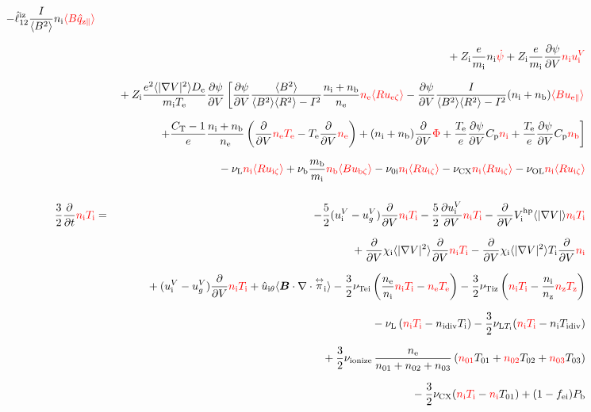 \documentclass[11pt]{article}
\def\bvec#1{\leavevmode\hbox{\boldmath$#1$}}
\let\vec=\bvec
\def\r#1{{\rm#1}}
\def\aves#1{\langle#1\rangle}
\def\dd#1#2{\frac{\partial #1}{\partial #2}}
\def\tensor#1{\mathord{\displaystyle\mathop{#1}^\leftrightarrow}}
\def\para{\parallel}
\def\ddV{\frac{\partial}{\partial V}}
\def\ddt{\frac{\partial}{\partial t}}
\def\mi{m_\r{i}}
\def\mb{m_\r{b}}
\def\nee{n_\r{e}}
\def\ni{n_\r{i}}
\def\nz{n_\r{z}}
\def\nb{n_\r{b}}
\def\Te{T_\r{e}}
\def\Ti{T_\r{i}}
\def\Tz{T_\r{z}}
\def\Zi{Z_\r{i}}
\def\uzt#1{u_{\r{#1}\zeta}}
\def\upara#1{u_{\r{#1}\para}}
\def\uhatth#1{\hat{u}_{\r{#1}\theta}}
\def\qhatpara#1{\hat{q}_{\r{#1}\para}}
\def\uV#1{u_\r{#1}^V}
\def\ugV{u_{g}^V}
\def\chis#1{\chi_\r{#1}}
\def\De{D_\r{e}}
\def\nun#1{\nu_\r{0#1}}
\def\ndiv#1{n_\r{#1div}}
\def\Tdiv#1{T_\r{#1div}}
\def\nuLT#1{\nu_{\r{L}T_\r{#1}}}
\def\fei{f_\r{ei}}
\def\bri{\aves{B^2}\aves{R^2} - I^2}
\def\Pb{P_\r{b}}
\def\nna{n_{01}}
\def\nnb{n_{02}}
\def\nnc{n_{03}}
\def\Tna{T_{01}}
\def\Tnb{T_{02}}
\def\Tnc{T_{03}}
\def\nuL{\nu_\r{L}}
\def\nuCX{\nu_\r{CX}}
\def\nuion{\nu_\r{ionize}}
\def\nub{\nu_\r{b}}
\def\nuOL{\nu_\r{OL}}
\def\red#1{\textcolor{red}{#1}}
\begin{document}
\begin{eqnarray}
  - \hat{\ell}_{12}^\r{iz} \frac{I}{\aves{B^2}} \ni \red{\aves{B \qhatpara{z}}}
\nonumber\\[2.5mm]&&{}
%
  + \Zi \frac{e}{\mi}              \ni \red{\dot{\psi}}
%
  + \Zi \frac{e}{\mi} \dd{\psi}{V} \red{\ni \uV{i}}
%
\nonumber\\[2.5mm]&&{}
%
%
  + \Zi \frac{e^2 \aves{|\nabla V|^2} \De}{\mi\Te} \dd{\psi}{V} 
%
    \left[  \dd{\psi}{V} \frac{\aves{B^2}}{\bri} \frac{\ni+\nb}{\nee}
            \red{\nee \aves{R \uzt{e}}}
          - \dd{\psi}{V} \frac{I}{\bri} (\ni+\nb) \red{\aves{B \upara{e}}} \right.
\nonumber\\[2.5mm]&&{}
%
    \left.+ \frac{C_\r{T}-1}{e} \frac{\ni+\nb}{\nee}
     \left(\ddV \red{\nee \Te} - \Te \ddV \red{\nee} \right)
	  + (\ni+\nb) \ddV \red{\Phi}
	  + \frac{\Te}{e} \dd{\psi}{V} C_\r{p} \red{\ni}
	  + \frac{\Te}{e} \dd{\psi}{V} C_\r{p} \red{\nb} \right]
\nonumber\\[2.5mm]&&{}
%
  - \nuL  \red{\ni \aves{R \uzt{i}}}
%
  + \nub  \frac{\mb}{\mi} \red{\nb \aves{B \uzt{b}}}
%
  - \nun{i} \red{\ni \aves{R \uzt{i}}}
%
  - \nuCX \red{\ni \aves{R \uzt{i}}}
%
  - \nuOL \red{\ni \aves{R \uzt{i}}}
\\[5mm]
  \frac{3}{2} \ddt \red{\ni \Ti}  &=& 
%
  - \frac{5}{2} ( \uV{i} - \ugV ) \ddV \red{\ni \Ti}
%
  - \frac{5}{2} \dd{\uV{i}}{V} \red{\ni \Ti}
%
  - \ddV V_\r{i}^\r{hp} \aves{|\nabla V|} \red{\ni \Ti}
\nonumber\\[2.5mm]&&{}
  + \ddV \chis{i} \aves{|\nabla V|^2} \ddV \red{\ni \Ti}
  - \ddV \chis{i} \aves{|\nabla V|^2} \Ti \ddV \red{\ni}
\nonumber\\[2.5mm]&&{}
%
  + ( \uV{i} - \ugV ) \ddV \red{\ni \Ti}
%
  + \uhatth{i} \aves{\vec{B}\cdot\nabla\cdot\tensor{\pi}_\r{i}}
%
  - \frac{3}{2} \nu_\r{Tei} \left(\frac{\nee}{\ni} \red{\ni \Ti} - \red{\nee \Te} \right)
  - \frac{3}{2} \nu_\r{Tiz} \left(\red{\ni \Ti} - \frac{\ni}{\nz}\red{\nz  \Tz} \right)
\nonumber\\[2.5mm]&&{}
%
  - \nuL \left(\red{\ni \Ti}  - \ndiv{i} \Ti \right)
%
  - \frac{3}{2} \nuLT{i} (\red{\ni \Ti} - \ni \Tdiv{i})
%
\nonumber\\[2.5mm]&&{}
  + \frac{3}{2} \nuion\, \frac{\nee}{\nna + \nnb + \nnc}\, (\red{\nna} \Tna +
  \red{\nnb} \Tnb + \red{\nnc} \Tnc)
\nonumber\\[2.5mm]&&{}
%
  - \frac{3}{2} \nuCX (\red{\ni \Ti} - \red{\ni} \Tna)
%
  + (1 - \fei) \Pb

\end{eqnarray}
\end{document}
